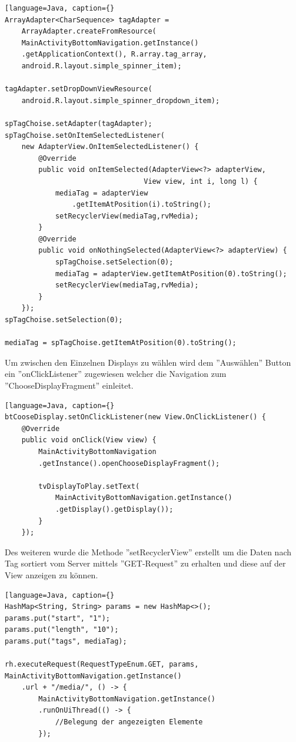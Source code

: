 \begin{lstlisting}[language=Java, caption={}
ArrayAdapter<CharSequence> tagAdapter =
	ArrayAdapter.createFromResource(
    MainActivityBottomNavigation.getInstance()
    .getApplicationContext(), R.array.tag_array,
    android.R.layout.simple_spinner_item);
        
tagAdapter.setDropDownViewResource(
	android.R.layout.simple_spinner_dropdown_item);
    	
spTagChoise.setAdapter(tagAdapter);
spTagChoise.setOnItemSelectedListener(
	new AdapterView.OnItemSelectedListener() {
        @Override
        public void onItemSelected(AdapterView<?> adapterView,
        						 View view, int i, long l) {
            mediaTag = adapterView
            	.getItemAtPosition(i).toString();
            setRecyclerView(mediaTag,rvMedia);
        }
        @Override
        public void onNothingSelected(AdapterView<?> adapterView) {
            spTagChoise.setSelection(0);
            mediaTag = adapterView.getItemAtPosition(0).toString();
            setRecyclerView(mediaTag,rvMedia);
        }
    });
spTagChoise.setSelection(0);

mediaTag = spTagChoise.getItemAtPosition(0).toString();
\end{lstlisting}
Um zwischen den Einzelnen Displays zu wählen wird dem ''Auswählen'' Button ein ''onClickListener'' zugewiesen welcher die Navigation zum ''ChooseDisplayFragment'' einleitet.

\begin{lstlisting}[language=Java, caption={}
btCooseDisplay.setOnClickListener(new View.OnClickListener() {
   	@Override
    public void onClick(View view) {
    	MainActivityBottomNavigation
    	.getInstance().openChooseDisplayFragment();
      	
        tvDisplayToPlay.setText(
        	MainActivityBottomNavigation.getInstance()
        	.getDisplay().getDisplay());
        }
    });
\end{lstlisting}

Des weiteren wurde die Methode ''setRecyclerView'' erstellt um die Daten nach Tag sortiert vom Server mittels ''GET-Request'' zu erhalten und diese auf der View anzeigen zu können.


\begin{lstlisting}[language=Java, caption={}
HashMap<String, String> params = new HashMap<>();
params.put("start", "1");
params.put("length", "10");
params.put("tags", mediaTag);
        
rh.executeRequest(RequestTypeEnum.GET, params, 										MainActivityBottomNavigation.getInstance()
    .url + "/media/", () -> {
    	MainActivityBottomNavigation.getInstance()
    	.runOnUiThread(() -> {
			//Belegung der angezeigten Elemente            
		});
\end{lstlisting}
